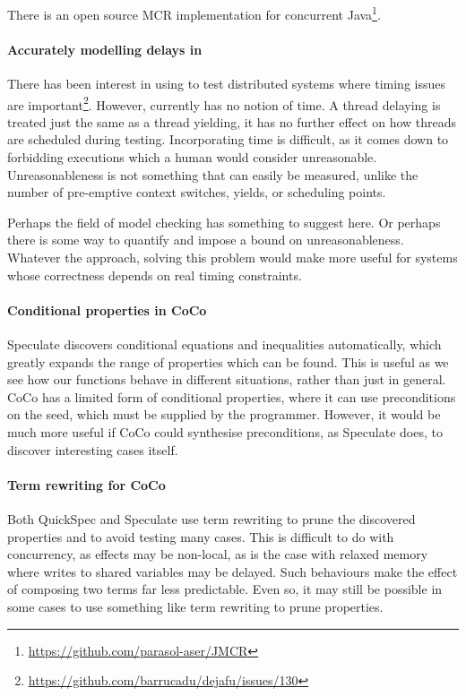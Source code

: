 There is an open source MCR implementation for concurrent
Java\footnote{\url{https://github.com/parasol-aser/JMCR}}.

\paragraph{Accurately modelling delays in \dejafu{}}
There has been interest in using \dejafu{} to test distributed systems
where timing issues are
important\footnote{\url{https://github.com/barrucadu/dejafu/issues/130}}.
However, \dejafu{} currently has no notion of time.  A thread delaying
is treated just the same as a thread yielding, it has no further
effect on how threads are scheduled during testing.  Incorporating
time is difficult, as it comes down to forbidding executions which a
human would consider unreasonable.  Unreasonableness is not something
that can easily be measured, unlike the number of pre-emptive context
switches, yields, or scheduling points.

Perhaps the field of model checking has something to suggest here.  Or
perhaps there is some way to quantify and impose a bound on
unreasonableness.  Whatever the approach, solving this problem would
make \dejafu{} more useful for systems whose correctness depends on
real timing constraints.

\paragraph{Conditional properties in CoCo}
Speculate\cite{braquehais2017} discovers conditional equations and
inequalities automatically, which greatly expands the range of
properties which can be found.  This is useful as we see how our
functions behave in different situations, rather than just in general.
CoCo has a limited form of conditional properties, where it can use
preconditions on the seed, which must be supplied by the programmer.
However, it would be much more useful if CoCo could synthesise
preconditions, as Speculate does, to discover interesting cases
itself.

\paragraph{Term rewriting for CoCo}
Both QuickSpec\cite{smallbone2017} and Speculate\cite{braquehais2017}
use term rewriting to prune the discovered properties and to avoid
testing many cases.  This is difficult to do with concurrency, as
effects may be non-local, as is the case with relaxed
memory\cite{zhang2015} where writes to shared variables may be
delayed.  Such behaviours make the effect of composing two terms far
less predictable.  Even so, it may still be possible in some cases to
use something like term rewriting to prune properties.
